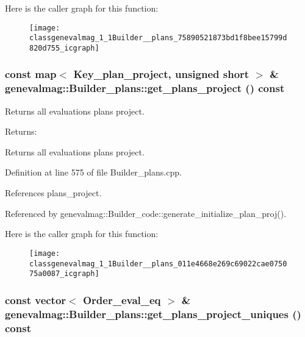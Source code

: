 Here is the caller graph for this function:\nopagebreak
\begin{figure}[H]
\begin{center}
\leavevmode
\texttt{[image: classgenevalmag\_1\_1Builder\_\_plans\_75890521873bd1f8bee15799d820d755\_icgraph]}
\end{center}
\end{figure}
\hypertarget{classgenevalmag_1_1Builder__plans_011e4668e269c69022cae075075a0087}{
\subsubsection[{get\_\-plans\_\-project}]{\setlength{\rightskip}{0pt plus 5cm}const map$<$ {\bf Key\_\-plan\_\-project}, unsigned short $>$ \& genevalmag::Builder\_\-plans::get\_\-plans\_\-project () const}}
\label{classgenevalmag_1_1Builder__plans_011e4668e269c69022cae075075a0087}


Returns all evaluations plans project. \begin{Desc}
\item[Returns:]\end{Desc}
Returns all evaluations plans project. 

Definition at line 575 of file Builder\_\-plans.cpp.

References plans\_\-project.

Referenced by genevalmag::Builder\_\-code::generate\_\-initialize\_\-plan\_\-proj().

Here is the caller graph for this function:\nopagebreak
\begin{figure}[H]
\begin{center}
\leavevmode
\texttt{[image: classgenevalmag\_1\_1Builder\_\_plans\_011e4668e269c69022cae075075a0087\_icgraph]}
\end{center}
\end{figure}
\hypertarget{classgenevalmag_1_1Builder__plans_a4f340be44a4b2592c8f5aaabf88305e}{
\subsubsection[{get\_\-plans\_\-project\_\-uniques}]{\setlength{\rightskip}{0pt plus 5cm}const vector$<$ {\bf Order\_\-eval\_\-eq} $>$ \& genevalmag::Builder\_\-plans::get\_\-plans\_\-project\_\-uniques () const}}
\label{classgenevalmag_1_1Builder__plans_a4f340be44a4b2592c8f5aaabf88305e}


